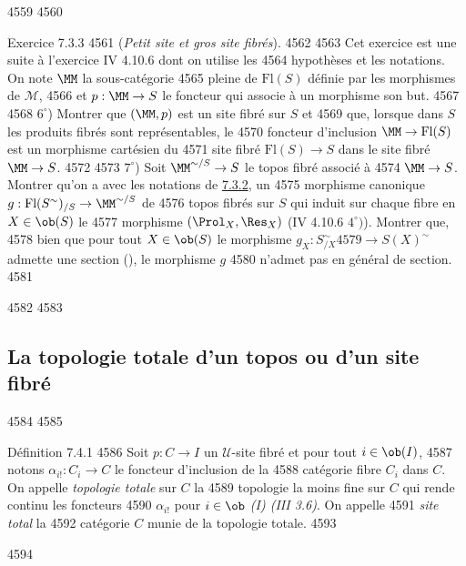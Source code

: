   4559	
  4560	\begin{enonce*}[remark]{Exercice 7.3.3}
  4561	(\emph{Petit site et gros site fibrés}).
  4562	
  4563	Cet exercice est une suite à l'exercice IV 4.10.6 dont on utilise les
  4564	hypothèses et les notations. On note $\MM$ la sous-catégorie
  4565	pleine de $\text{Fl}(S)$ définie par les morphismes de $ℳ$,
  4566	et $p : \MM \to S$ le foncteur qui associe à un morphisme son but.
  4567	
  4568	$6^{\circ}$) Montrer que $(\MM, p)$ est un site fibré sur $S$ et
  4569	que, lorsque dans $S$ les produits fibrés sont représentables, le
  4570	foncteur d'inclusion $\MM \to \text{Fl}(S)$ est un morphisme cartésien du
  4571	site fibré $\text{Fl} (S) \to S$ dans le site fibré $\MM \to S$.
  4572	
  4573	$7^{\circ}$) Soit $\MM^{\sim/S} \to S$ le topos fibré associé à
  4574	$\MM \to S$. Montrer qu'on a avec les notations de \hyperref[VI.exem7.3.2]{7.3.2}, un
  4575	morphisme canonique $g : \text{Fl} (S^{\sim})_{/S} \to \MM^{\sim/S}$ de
  4576	topos fibrés sur $S$ qui induit sur chaque fibre en $X \in \ob (S)$ le
  4577	morphisme $(\Prol_{X}, \Res_X)$ (IV 4.10.6 $4^{\circ})$). Montrer que,
  4578	bien que pour tout $X \in \ob (S)$ le morphisme $g_X : S^{\sim}_{/X}
  4579	\to S(X)^{\sim}$ admette une section (\loccit), le morphisme $g$
  4580	n'admet pas en général de section.
  4581	\end{enonce*}
  4582	
  4583	\subsection{La topologie totale d'un topos ou d'un site fibré}
  4584	
  4585	\begin{enonce*}{Définition 7.4.1}
  4586	Soit $p  : C \to I$ un $𝒰$-site fibré et pour tout $i \in \ob (I)$,
  4587	notons $\alpha_{i!} : C_i \to C$ le foncteur d'inclusion de la
  4588	catégorie fibre $C_i$ dans $C$. On appelle \emph{topologie totale} sur $C$ la
  4589	topologie la moins fine sur $C$ qui rende continu les foncteurs
  4590	$\alpha_{i!}$ pour $i \in \ob$ \emph{(I) (III 3.6)}. On appelle
  4591	\emph{site total}  la
  4592	catégorie $C$ munie de la topologie totale.
  4593	\end{enonce*}
  4594	
